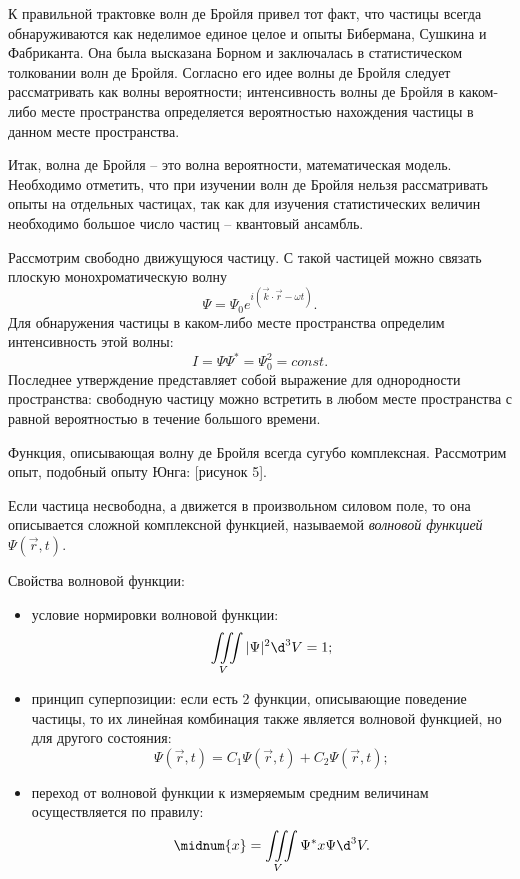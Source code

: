 К правильной трактовке волн де Бройля привел тот факт, что частицы всегда
обнаруживаются как неделимое единое целое и опыты Бибермана, Сушкина и
Фабриканта. Она была высказана Борном и заключалась в статистическом толковании
волн де Бройля. Согласно его идее волны де Бройля следует рассматривать как
волны вероятности; интенсивность волны де Бройля в каком-либо месте пространства
определяется вероятностью нахождения частицы в данном месте пространства.

Итак, волна де Бройля -- это волна вероятности, математическая модель.
Необходимо отметить, что при изучении волн де Бройля нельзя рассматривать опыты
на отдельных частицах, так как для изучения статистических величин необходимо
большое число частиц -- квантовый ансамбль.

Рассмотрим свободно движущуюся частицу. С такой частицей можно связать плоскую
монохроматическую волну
\[
    \Psi = \Psi_0 e^{i(\vec{k}\cdot\vec{r} - \omega t)}.
\]
Для обнаружения частицы в каком-либо месте пространства определим интенсивность
этой волны:
\[
    I = \Psi\Psi^* = \Psi_0^2 = const.
\]
Последнее утверждение представляет собой выражение для однородности
пространства: свободную частицу можно встретить в любом месте пространства с
равной вероятностью в течение большого времени.

Функция, описывающая волну де Бройля всегда сугубо комплексная. Рассмотрим опыт,
подобный опыту Юнга: [рисунок 5].

Если частица несвободна, а движется в произвольном силовом поле, то она
описывается сложной комплексной функцией, называемой \emph{волновой функцией}
\( \Psi(\vec{r}, t) \).

Свойства волновой функции:
\begin{itemize}
    \item условие нормировки волновой функции:
        \[
            \iiint\limits_V |\Psi|^2 \d^3 V = 1;
        \]
    \item принцип суперпозиции: если есть 2 функции, описывающие поведение
        частицы, то их линейная комбинация также  является волновой функцией,
        но для другого состояния:
    \[
        \Psi(\vec{r}, t) = C_1\Psi(\vec{r}, t) + C_2\Psi(\vec{r}, t);
    \]
    \item переход от волновой функции к измеряемым средним величинам
        осуществляется по правилу: 
    \[
        \midnum{x} = \iiint\limits_V \Psi^* x \Psi \d^3 V.
    \]
\end{itemize}

